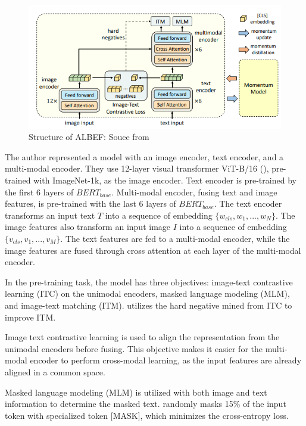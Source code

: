 \begin{figure}[htbp]
    \begin{center}
        \includegraphics[width=\linewidth]{img/albef_model_structure.png}
        \caption{Structure of ALBEF: Souce from \cite{li2021align}}
        \label{fig:albef}
    \end{center}
\end{figure}

The author represented a model with an image encoder, text encoder, and a multi-modal encoder. They use 12-layer visual transformer ViT-B/16 (\cite{dosovitskiy2021image}), pre-trained with ImageNet-1k, as the image encoder. 
Text encoder is pre-trained by the first 6 layers of $BERT_{base}$. Multi-modal encoder, fusing text and image features, is pre-trained with the last 6 layers of $BERT_{base}$.
The text encoder transforms an input text $T$ into a sequence of embedding $\{w_{cls}, w_1, ..., w_N\}$. The image features also transform an input image $I$ into a sequence of embedding $\{v_{cls}, v_1, ..., v_M\}$. The text features are fed to a multi-modal encoder, while the image features are fused through cross attention at each layer of the multi-modal encoder.

In the pre-training task, the model has three objectives: image-text contrastive learning (ITC) on the unimodal encoders, masked language modeling (MLM), and image-text matching (ITM).
\cite{li2021align} utilizes the hard negative mined from ITC to improve ITM.

Image text contrastive learning is used to align the representation from the unimodal encoders before fusing. This objective makes it easier for the multi-modal encoder to perform cross-modal learning, as the input features are already aligned in a common space. 

Masked language modeling (MLM) is utilized with both image and text information to determine the masked text. \cite{li2021align} randomly masks 15\% of the input token with specialized token [MASK], which minimizes the cross-entropy loss.

